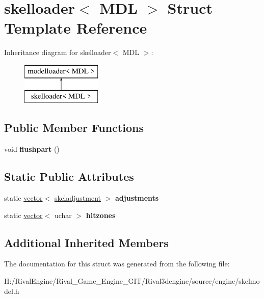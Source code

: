 \hypertarget{structskelloader}{}\section{skelloader$<$ M\+DL $>$ Struct Template Reference}
\label{structskelloader}
Inheritance diagram for skelloader$<$ M\+DL $>$\+:\begin{figure}[H]
\begin{center}
\leavevmode
\includegraphics[height=2.000000cm]{structskelloader}
\end{center}
\end{figure}
\subsection*{Public Member Functions}
\begin{DoxyCompactItemize}
\item 
\mbox{\label{structskelloader_a61ceaf0d41b23bfe0de7f889aa200bcf}} 
void {\bfseries flushpart} ()
\end{DoxyCompactItemize}
\subsection*{Static Public Attributes}
\begin{DoxyCompactItemize}
\item 
\mbox{\label{structskelloader_a0aafb10ea3d06b769f9abf56340d53a0}} 
static \hyperlink{structvector}{vector}$<$ \hyperlink{structskeladjustment}{skeladjustment} $>$ {\bfseries adjustments}
\item 
\mbox{\label{structskelloader_a5c48fe3149db688d4572f82a7c786d74}} 
static \hyperlink{structvector}{vector}$<$ uchar $>$ {\bfseries hitzones}
\end{DoxyCompactItemize}
\subsection*{Additional Inherited Members}


The documentation for this struct was generated from the following file\+:\begin{DoxyCompactItemize}
\item 
H\+:/\+Rival\+Engine/\+Rival\+\_\+\+Game\+\_\+\+Engine\+\_\+\+G\+I\+T/\+Rival3dengine/source/engine/skelmodel.\+h\end{DoxyCompactItemize}
